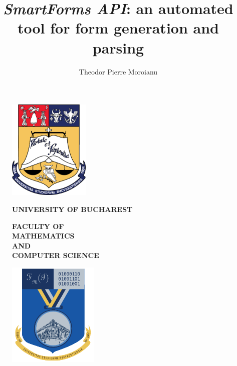 \documentclass[11pt, a4paper]{report}
\title{\emph{SmartForms API}: an automated tool for form generation and parsing}
\author{Theodor Pierre Moroianu}
\begin{document}
\cleardoublepage
\pagestyle{front}
\let\ps@plain\ps@front

\begin{titlepage}

  
  \begin{figure}[!htb]
      \centering
      \begin{minipage}{0.2\textwidth}
          \includegraphics[height=4.8cm]{logo-ub.png}
      \end{minipage}
      \begin{minipage}{0.5\textwidth}
          \large
          \vspace{0.2cm}
          \begin{center}
              \textbf{UNIVERSITY OF BUCHAREST}
          \end{center}
          \vspace{0.3cm}
          \begin{center}
              \textbf{
                  FACULTY OF\\
                  MATHEMATICS\\AND\\ COMPUTER SCIENCE
              }
          \end{center}
      \end{minipage}
      \begin{minipage}{0.2\textwidth}
          \includegraphics[height=5cm]{logo-fmi.png}
      \end{minipage}
  \end{figure}
  

\end{titlepage}
\end{document}
